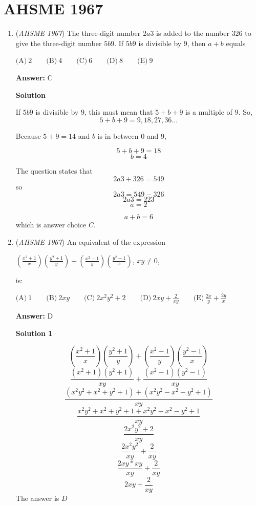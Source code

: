 \section{AHSME 1967}
        \begin{enumerate}
        	\item (\textit{AHSME 1967}) The three-digit number $2a3$ is added to the number $326$ to give the three-digit number $5b9$.  If $5b9$ is divisible by 9, then $a+b$ equals


 $\text{(A)}\ 2\qquad\text{(B)}\ 4\qquad\text{(C)}\ 6\qquad\text{(D)}\ 8\qquad\text{(E)}\ 9$

 \textbf{Answer: }C



\textbf{Solution}

If $5b9$ is divisible by $9$, this must mean that $5 + b + 9$ is a multiple of $9$. So, 
 \[5 + b + 9 = 9, 18, 27, 36...\] 

 Because $5 + 9 = 14$ and $b$ is in between 0 and 9, 

 
 \[5 + b + 9 = 18\]
 \[b = 4\]

 The question states that
 \[2a3 + 326 = 549\]so 
 \[2a3 = 549 - 326\]
 \[2a3 = 223\]
 \[a = 2\]

 \[a + b = 6\]which is answer choice $\boxed{C}$.

 


	\item (\textit{AHSME 1967}) An equivalent of the expression


 $\left(\frac{x^2+1}{x}\right)\left(\frac{y^2+1}{y}\right)+\left(\frac{x^2-1}{y}\right)\left(\frac{y^2-1}{x}\right)$, $xy \not= 0$,


 is:


 $\text{(A)}\ 1\qquad\text{(B)}\ 2xy\qquad\text{(C)}\ 2x^2y^2+2\qquad\text{(D)}\ 2xy+\frac{2}{xy}\qquad\text{(E)}\ \frac{2x}{y}+\frac{2y}{x}$

 \textbf{Answer: }D



\textbf{Solution 1}


 \[\left(\frac{x^2+1}{x}\right)\left(\frac{y^2+1}{y}\right)+\left(\frac{x^2-1}{y}\right)\left(\frac{y^2-1}{x}\right)\]
 \[\frac{(x^2+1)(y^2+1)}{xy} + \frac{(x^2-1)(y^2-1)}{xy}\]
 \[\frac{(x^2y^2+x^2+y^2+1) + (x^2y^2-x^2-y^2+1)}{xy}\]
 \[\frac{x^2y^2+x^2+y^2+1 + x^2y^2-x^2-y^2+1}{xy}\]
 \[\frac{2x^2y^2+2}{xy}\]
 \[\frac{2x^2y^2}{xy} + \frac{2}{xy}\]
 \[\frac{2xy * xy}{xy} + \frac{2}{xy}\]
 \[2xy + \frac{2}{xy}\]The answer is $\boxed{D}$





\end{enumerate}
